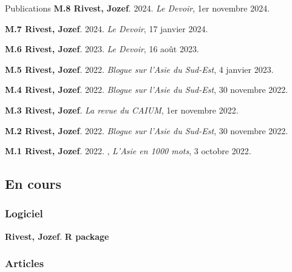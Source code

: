 \documentclass{resume} %
\begin{document}
\begin{rSection}{Publications}
{\textbf{M.8 Rivest, Jozef}. 2024.  \textit{Le Devoir}, 1er novembre 2024.}

{\textbf{M.7 Rivest, Jozef}. 2024.  \textit{Le Devoir}, 17 janvier 2024.} \par

{\textbf{M.6 Rivest, Jozef}. 2023.  \textit{Le Devoir}, 16 août 2023.} \par

{\textbf{M.5 Rivest, Jozef}. 2022.  \textit{Blogue sur l'Asie du Sud-Est}, 4 janvier 2023.} \par 

{\textbf{M.4 Rivest, Jozef}. 2022.  \textit{Blogue sur l'Asie du Sud-Est}, 30 novembre 2022.} \par

{\textbf{M.3 Rivest, Jozef}.  \textit{La revue du CAIUM}, 1er novembre 2022.} \par

{\textbf{M.2 Rivest, Jozef}. 2022.  \textit{Blogue sur l'Asie du Sud-Est}, 30 novembre 2022.} \par 

{\textbf{M.1 Rivest, Jozef}. 2022. , \textit{L'Asie en 1000 mots}, 3 octobre 2022.} \par

\subsection*{En cours}

\subsubsection*{Logiciel}

{\textbf{Rivest, Jozef}.  \textbf{R package}}

\subsubsection*{Articles}


\end{rSection}
\end{document}
